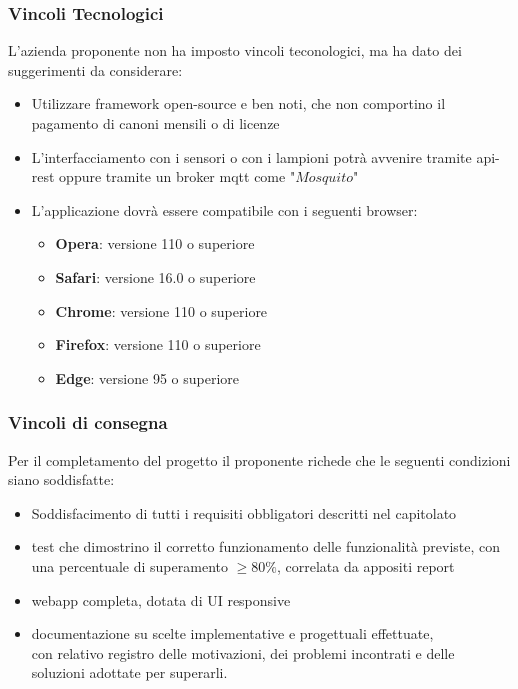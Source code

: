 \documentclass[12pt]{article}
\begin{document}
\subsubsection{Vincoli Tecnologici}
L'azienda proponente non ha imposto vincoli teconologici, ma ha dato dei suggerimenti da considerare:
\begin{itemize}
	\item Utilizzare framework open-source e ben noti, che non comportino il pagamento di canoni mensili o di licenze
	\item L'interfacciamento con i sensori o con i lampioni potrà avvenire tramite api-rest oppure tramite un broker mqtt come "$Mosquito$"
	\item L'applicazione dovrà essere compatibile con i seguenti browser: 
	\begin{itemize}
		\item \textbf{Opera}: versione 110 o superiore
		\item \textbf{Safari}: versione 16.0 o superiore
		\item \textbf{Chrome}: versione 110 o superiore
		\item \textbf{Firefox}: versione 110 o superiore
		\item \textbf{Edge}: versione 95 o superiore
	\end{itemize}
\end{itemize}

\subsubsection{Vincoli di consegna}
Per il completamento del progetto il proponente richede che le seguenti condizioni siano soddisfatte:
\begin{itemize}
	\item Soddisfacimento di tutti i requisiti obbligatori descritti nel capitolato
	\item test che dimostrino il corretto funzionamento delle funzionalità previste, con una percentuale di superamento \begin{math}\geq 80\% \end{math}, correlata da appositi report
	\item webapp completa, dotata di UI responsive
	\item documentazione su scelte implementative e progettuali effettuate,\\ con relativo registro delle motivazioni, dei problemi incontrati e delle soluzioni adottate per superarli.
\end{itemize}
\end{document}
